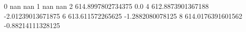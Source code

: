 0 nan nan
1 nan nan
2 614.8997802734375 0.0
4 612.8873901367188 -2.01239013671875
6 613.611572265625 -1.2882080078125
8 614.0176391601562 -0.88214111328125
